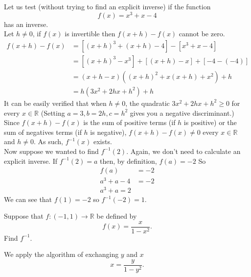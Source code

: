 \begin{example}
  Let us test (without trying to find an explicit inverse) if the function 
  \[ f(x) = x^{3}+ x- 4 \]
  has an inverse. \\ 
  Let \( h \neq 0 \), if \( f(x) \) is invertible then 
  \( f(x+ h) - f(x) \) cannot be zero. 
  \begin{align*}
    f(x + h) - f(x) &= \left[ \left( x+ h \right)^{3} + \left( x +h \right) -4\right] - \left[ x^{3} +x -4 \right] \\
    &= \left[ \left( x+h  \right)^{3} - x^{3} \right] + \left[ \left( x+h \right) -x \right] + \left[ -4 - \left( -4 \right) \right] \\
    &= \left( x+h -x \right)\left( \left( x+h \right)^{2}  +x \left( x+h \right) +x^{2 }\right) +h \tag{Applying difference of cubes.} \\
    &= h \left( 3x^{2} + 2hx + h^{2} \right) +h
  \end{align*}
  It can be easily verified that when \( h \neq 0 \), the quadratic \( 3x^{2} +2hx + h^{2} \ge 0 \) for every \( x \in \mathbb{R} \) (Setting \(a = 3, b =2h, c =h^{2}\) gives you a negative discriminant.) Since \( f(x+h) - f(x) \) is the sum of positive terms (if \( h \) is positive) or the sum of negatives terms (if \( h  \) is negative), \( f(x+h)- f(x) \neq 0 \) every \( x \in \mathbb{R} \) and \( h \neq 0 \). As such, \( f^{-1} (x) \) exists. \\ 
  Now suppose we wanted to find \( f^{-1} (2) \). Again, we don't need to calculate an explicit inverse. If \( f^{-1}(2)=a \) then, by definition, \( f(a) =-2 \) So 
  \begin{align*}
    f(a) &= -2 \\
    a^{3} + a -4 &= -2 \\
    a^{3} + a =2 
  \end{align*}
We can see that \( f(1) =-2 \) so \(  f^{-1} (-2) = 1 \).
\end{example}

\begin{exercise}
  Suppose that \( f: \left( -1,1  \right) \to \mathbb{R} \) be defined by 
  \[ f(x) = \frac{x}{1-x^{2}} .\] 
  Find \( f^{-1} \).
\end{exercise}
\begin{solution}
    We apply the algorithm of exchanging \( y \) and \( x \)
    \[ x = \frac{y}{1-y^{2}} .\]
    
    

    
\end{solution}
